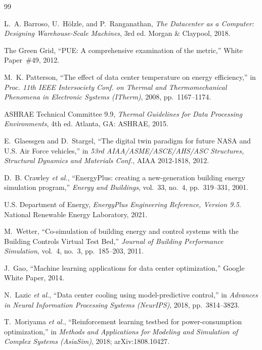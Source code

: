 \documentclass[11pt]{article}
\begin{document}
\begin{thebibliography}{99}
\setlength{\itemsep}{1pt}

 L.~A. Barroso, U.~H\"olzle, and P.~Ranganathan,
\emph{The Datacenter as a Computer: Designing Warehouse-Scale Machines}, 3rd ed.
Morgan \& Claypool, 2018.

 The Green Grid, ``PUE: A comprehensive examination of the metric,''
White Paper~\#49, 2012.

 M.~K. Patterson, ``The effect of data center temperature on energy
efficiency,'' in \emph{Proc. 11th IEEE Intersociety Conf. on Thermal and Thermomechanical
Phenomena in Electronic Systems (ITherm)}, 2008, pp.~1167--1174.

 ASHRAE Technical Committee 9.9, \emph{Thermal Guidelines for Data
Processing Environments}, 4th ed. Atlanta, GA: ASHRAE, 2015.

 E.~Glaessgen and D.~Stargel, ``The digital twin paradigm for future
NASA and U.S. Air Force vehicles,'' in \emph{53rd AIAA/ASME/ASCE/AHS/ASC Structures,
Structural Dynamics and Materials Conf.}, AIAA 2012-1818, 2012.

 D.~B. Crawley \emph{et al.}, ``EnergyPlus: creating a new-generation
building energy simulation program,'' \emph{Energy and Buildings}, vol.~33, no.~4,
pp.~319--331, 2001.

 U.S. Department of Energy, \emph{EnergyPlus Engineering Reference,
Version 9.5}. National Renewable Energy Laboratory, 2021.

 M.~Wetter, ``Co-simulation of building energy and control systems with the
Building Controls Virtual Test Bed,'' \emph{Journal of Building Performance Simulation},
vol.~4, no.~3, pp.~185--203, 2011.

 J.~Gao, ``Machine learning applications for data center optimization,''
Google White Paper, 2014.

 N.~Lazic \emph{et al.}, ``Data center cooling using model-predictive
control,'' in \emph{Advances in Neural Information Processing Systems (NeurIPS)}, 2018,
pp.~3814--3823.

 T.~Moriyama \emph{et al.}, ``Reinforcement learning testbed for
power-consumption optimization,'' in \emph{Methods and Applications for Modeling and
Simulation of Complex Systems (AsiaSim)}, 2018; arXiv:1808.10427.


\end{thebibliography}
\end{document}
